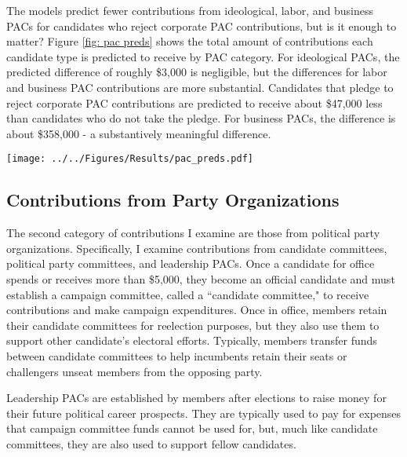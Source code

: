\documentclass[12pt]{article}
\begin{document}
The models predict fewer contributions from ideological, labor, and business PACs for candidates who reject corporate PAC contributions, but is it enough to matter? Figure \ref{fig: pac preds} shows the total amount of contributions each candidate type is predicted to receive by PAC category. For ideological PACs, the predicted difference of roughly \$3,000 is negligible, but the differences for labor and business PAC contributions are more substantial. Candidates that pledge to reject corporate PAC contributions are predicted to receive about \$47,000 less than candidates who do not take the pledge. For business PACs, the difference is about \$358,000 - a substantively meaningful difference.  

\begin{figure*}[!htb]
    \centering
    \texttt{[image: ../../Figures/Results/pac\_preds.pdf]}
    \caption{\textbf{Total Predicted Contributions from Each PAC by Candidate Type.} This figure shows that candidates who pledge to reject PAC contributions are predicted to received fewer contributions from PACs, but the difference is largest for contributions from business PACs.}
    \label{fig: pac preds}
\end{figure*}


\subsection{Contributions from Party Organizations}

The second category of contributions I examine are those from political party organizations. Specifically, I examine contributions from candidate committees, political party committees, and leadership PACs. Once a candidate for office spends or receives more than \$5,000, they become an official candidate and must establish a campaign committee, called a ``candidate committee," to receive contributions and make campaign expenditures. Once in office, members retain their candidate committees for reelection purposes, but they also use them to support other candidate's electoral efforts. Typically, members transfer funds between candidate committees to help incumbents retain their seats or challengers unseat members from the opposing party. 

Leadership PACs are established by members after elections to raise money for their future political career prospects. They are typically used to pay for expenses that campaign committee funds cannot be used for, but, much like candidate committees, they are also used to support fellow candidates. 
\end{document}
